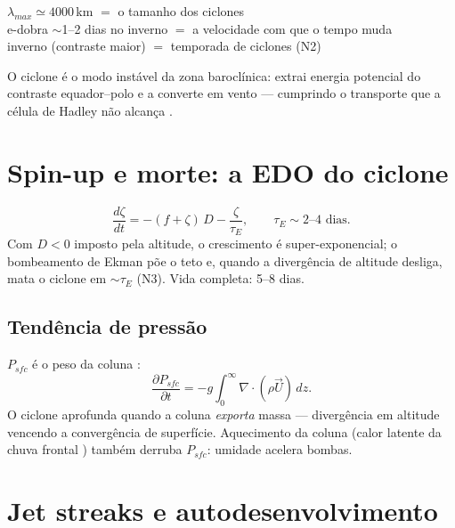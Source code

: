 \documentclass[11pt]{article}
\begin{document}
\begin{noquadro}
$\lambda_{max} \simeq 4000$\,km $=$ o tamanho dos ciclones\\
e-dobra $\sim$1--2 dias no inverno $=$ a velocidade com que o tempo
muda\\
inverno (contraste maior) $=$ temporada de ciclones (N2)
\end{noquadro}

O ciclone é o modo instável da zona baroclínica: extrai energia
potencial do contraste equador--polo e a converte em vento — cumprindo
o transporte que a célula de Hadley não alcança
.

\section{Spin-up e morte: a EDO do ciclone}\label{sec:spinup}

\begin{formadif}
\[ \frac{d\zeta}{dt} = -(f+\zeta)\,D - \frac{\zeta}{\tau_E},
\qquad \tau_E \sim \text{2--4 dias}. \]
Com $D<0$ imposto pela altitude, o crescimento é
super-exponencial; o bombeamento de Ekman  põe o teto e, quando a divergência de altitude desliga, mata o
ciclone em $\sim\tau_E$ (N3). Vida completa: 5--8 dias.
\end{formadif}

\subsection{Tendência de pressão}

\begin{formadif}
$P_{sfc}$ é o peso da coluna :
\[ \frac{\partial P_{sfc}}{\partial t} =
-g\int_0^\infty \nabla\cdot(\rho\vec U)\,dz. \]
O ciclone aprofunda quando a coluna \emph{exporta} massa — divergência
em altitude vencendo a convergência de superfície. Aquecimento da
coluna (calor latente da chuva frontal )
também derruba $P_{sfc}$: umidade acelera bombas.
\end{formadif}

\section{Jet streaks e autodesenvolvimento}\label{sec:jet}

\end{document}
